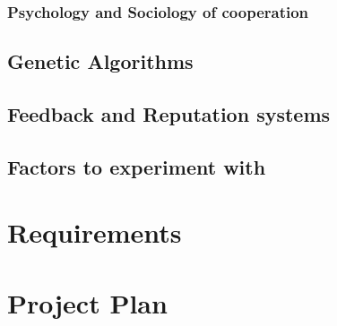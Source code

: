\documentclass{article}
\begin{document}
\subsubsection{Psychology and Sociology of cooperation}
\label{sec:psychology-sociology-cooperation}

\subsection{Genetic Algorithms}
\label{sec:genetic-algorithms}

\subsection{Feedback and Reputation systems}
\label{sec:reputation-systems}

\subsection{Factors to experiment with}
\label{sec:factors-experiment}

\section{Requirements}
\label{sec:requirements}

\section{Project Plan}
\label{sec:project-plan}

\printbibliography
\end{document}
